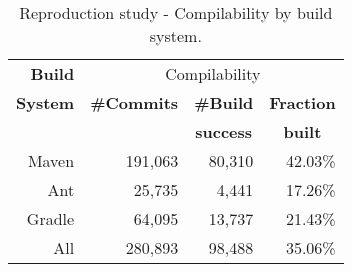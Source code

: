 
\begin{table*}[h]
  \caption{Reproduction study - Compilability by build system.}
  \label{table:results-reproduction-build-systems}

\begin{center}
  \begin{tabular}{r|rrr}
  \toprule
  \bf{Build} & \multicolumn{3}{c}{Compilability}                                  \\
  \bf{System}	& \bf{\#Commits} & \bf{\#Build} & \bf{Fraction} \\
             &  & \multicolumn{1}{c}{{\bf success}} & \multicolumn{1}{c}{{\bf built}} \\
  \midrule
  Maven           &        191,063  &                     80,310 &            42.03\%  \\
  Ant             &         25,735  &                      4,441 &            17.26\%  \\
  Gradle          &         64,095  &                     13,737 &            21.43\%  \\
  \midrule
  All             &        280,893  &                     98,488 &            35.06\%  \\
  \bottomrule
  \end{tabular}
\end{center}

\end{table*}



